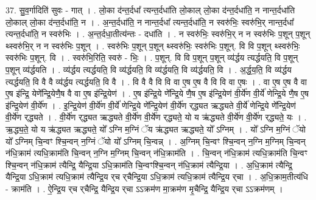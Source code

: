 \documentclass[17pt]{extarticle}
\begin{document}
37. सु॒व॒र्गादिति॑ सुवः - गात् । . लो॒का द॑न्त॒र्दधा᳚ त्यन्त॒र्दधा॑ति लो॒काल् लो॒का द॑न्त॒र्दधा॑ति॒ न नान्त॒र्दधा॑ति लो॒काल् लो॒का द॑न्त॒र्दधा॑ति॒ न । . अ॒न्त॒र्दधा॑ति॒ न नान्त॒र्दधा᳚ त्यन्त॒र्दधा॑ति॒ न स्वरु॑भिः॒ स्वरु॑भि॒र् नान्त॒र्दधा᳚ त्यन्त॒र्दधा॑ति॒ न स्वरु॑भिः । . अ॒न्त॒र्दधा॒तीत्य॑न्तः - दधा॑ति । . न स्वरु॑भिः॒ स्वरु॑भि॒र् न न स्वरु॑भिः प॒शून् प॒शून् थ्स्वरु॑भि॒र् न न स्वरु॑भिः प॒शून् । . स्वरु॑भिः प॒शून् प॒शून् थ्स्वरु॑भिः॒ स्वरु॑भिः प॒शून्. वि वि प॒शून् थ्स्वरु॑भिः॒ स्वरु॑भिः प॒शून्. वि । . स्वरु॑भि॒रिति॒ स्वरु॑ - भिः॒ । . प॒शून्. वि वि प॒शून् प॒शून् व्य॑र्द्धय त्यर्द्धयति॒ वि प॒शून् प॒शून् व्य॑र्द्धयति । . व्य॑र्द्धय त्यर्द्धयति॒ वि व्य॑र्द्धयति॒ वि व्य॑र्द्धयति॒ वि व्य॑र्द्धयति॒ वि । . अ॒र्द्ध॒य॒ति॒ वि व्य॑र्द्धय त्यर्द्धयति॒ वि वै वै व्य॑र्द्धय त्यर्द्धयति॒ वि वै । . वि वै वै वि वि वा ए॒ष ए॒ष वै वि वि वा ए॒षः । . वा ए॒ष ए॒ष वै वा ए॒ष इ॑न्द्रि॒ येणे᳚न्द्रि॒येणै॒ष वै वा ए॒ष इ॑न्द्रि॒येण॑ । . ए॒ष इ॑न्द्रि॒ये णे᳚न्द्रि॒ये णै॒ष ए॒ष इ॑न्द्रि॒येण॑ वी॒र्ये॑ण वी॒र्ये॑ णेन्द्रि॒ये णै॒ष ए॒ष इ॑न्द्रि॒येण॑ वी॒र्ये॑ण । . इ॒न्द्रि॒येण॑ वी॒र्ये॑ण वी॒र्ये॑ णेन्द्रि॒ये णे᳚न्द्रि॒येण॑ वी॒र्ये॑ण र्‌द्ध्यत ऋद्ध्यते वी॒र्ये॑ णेन्द्रि॒ये 
णे᳚न्द्रि॒येण॑ वी॒र्ये॑ण र्‌द्ध्यते । . वी॒र्ये॑ण र्‌द्ध्यत ऋद्ध्यते वी॒र्ये॑ण वी॒र्ये॑ण र्‌द्ध्यते॒ यो य ऋ॑द्ध्यते वी॒र्ये॑ण वी॒र्ये॑ण र्‌द्ध्यते॒ यः । . ऋ॒द्ध्य॒ते॒ यो य ऋ॑द्ध्यत ऋद्ध्यते॒ यो᳚ ऽग्नि म॒ग्निं ॅय ऋ॑द्ध्यत ऋद्ध्यते॒ यो᳚ ऽग्निम् । . यो᳚ ऽग्नि म॒ग्निं ॅयो यो᳚ ऽग्निम् चि॒न्वꣳ श्चि॒न्वन् न॒ग्निं ॅयो यो᳚ ऽग्निम् चि॒न्वन्न् । . अ॒ग्निम् चि॒न्वꣳ श्चि॒न्वन् न॒ग्नि म॒ग्निम् चि॒न्वन् न॑धि॒क्राम॑ त्यधि॒क्राम॑ति चि॒न्वन् न॒ग्नि म॒ग्निम् चि॒न्वन् न॑धि॒क्राम॑ति । . चि॒न्वन् न॑धि॒क्राम॑ त्यधि॒क्राम॑ति चि॒न्वꣳ श्चि॒न्वन्  न॑धि॒क्राम॑ त्यैन्द्रि॒ यैन्द्रि॒या ऽधि॒क्राम॑ति चि॒न्वꣳश्चि॒न्वन् न॑धि॒क्राम॑ त्यैन्द्रि॒या । . अ॒धि॒क्राम॑ त्यैन्द्रि॒ यैन्द्रि॒या ऽधि॒क्राम॑ त्यधि॒क्राम॑ त्यैन्द्रि॒य र्‌च र्‌चैन्द्रि॒या ऽधि॒क्राम॑ त्यधि॒क्राम॑ त्यैन्द्रि॒य र्‌चा । . अ॒धि॒क्राम॒तीत्य॑धि - क्राम॑ति । . ऐ॒न्द्रि॒य र्‌च र्‌चैन्द्रि॒ यैन्द्रि॒य र्‌चा ऽऽक्रम॑ण मा॒क्रम॑ण मृ॒चैन्द्रि॒ यैन्द्रि॒य र्‌चा ऽऽक्रम॑णम् । \newline
\pagebreak
{}
\end{document}

